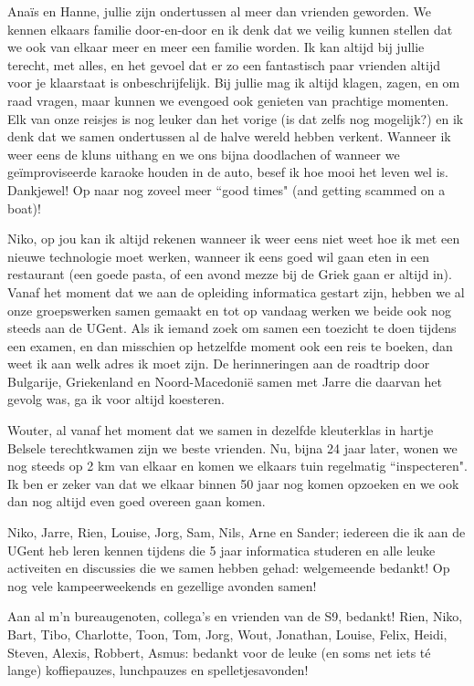 Anaïs en Hanne, jullie zijn ondertussen al meer dan vrienden geworden.
We kennen elkaars familie door-en-door en ik denk dat we veilig kunnen stellen dat we ook van elkaar meer en meer een familie worden.
Ik kan altijd bij jullie terecht, met alles, en het gevoel dat er zo een fantastisch paar vrienden altijd voor je klaarstaat is onbeschrijfelijk.
Bij jullie mag ik altijd klagen, zagen, en om raad vragen, maar kunnen we evengoed ook genieten van prachtige momenten.
Elk van onze reisjes is nog leuker dan het vorige (is dat zelfs nog mogelijk?) en ik denk dat we samen ondertussen al de halve wereld hebben verkent.
Wanneer ik weer eens de kluns uithang en we ons bijna doodlachen of wanneer we geïmproviseerde karaoke houden in de auto, besef ik hoe mooi het leven wel is.
Dankjewel!
Op naar nog zoveel meer ``good times" (and getting scammed on a boat)!

Niko, op jou kan ik altijd rekenen wanneer ik weer eens niet weet hoe ik met een nieuwe technologie moet werken, wanneer ik eens goed wil gaan eten in een restaurant (een goede pasta, of een avond mezze bij de Griek gaan er altijd in).
Vanaf het moment dat we aan de opleiding informatica gestart zijn, hebben we al onze groepswerken samen gemaakt en tot op vandaag werken we beide ook nog steeds aan de UGent.
Als ik iemand zoek om samen een toezicht te doen tijdens een examen, en dan misschien op hetzelfde moment ook een reis te boeken, dan weet ik aan welk adres ik moet zijn.
De herinneringen aan de roadtrip door Bulgarije, Griekenland en Noord-Macedonië samen met Jarre die daarvan het gevolg was, ga ik voor altijd koesteren.

Wouter, al vanaf het moment dat we samen in dezelfde kleuterklas in hartje Belsele terechtkwamen zijn we beste vrienden.
Nu, bijna 24 jaar later, wonen we nog steeds op 2 km van elkaar en komen we elkaars tuin regelmatig ``inspecteren".
Ik ben er zeker van dat we elkaar binnen 50 jaar nog komen opzoeken en we ook dan nog altijd even goed overeen gaan komen.

Niko, Jarre, Rien, Louise, Jorg, Sam, Nils, Arne en Sander; iedereen die ik aan de UGent heb leren kennen tijdens die 5 jaar informatica studeren en alle leuke activeiten en discussies die we samen hebben gehad: welgemeende bedankt!
Op nog vele kampeerweekends en gezellige avonden samen!

Aan al m'n bureaugenoten, collega's en vrienden van de S9, bedankt!
Rien, Niko, Bart, Tibo, Charlotte, Toon, Tom, Jorg, Wout, Jonathan, Louise, Felix, Heidi, Steven, Alexis, Robbert, Asmus: bedankt voor de leuke (en soms net iets té lange) koffiepauzes, lunchpauzes en spelletjesavonden!

